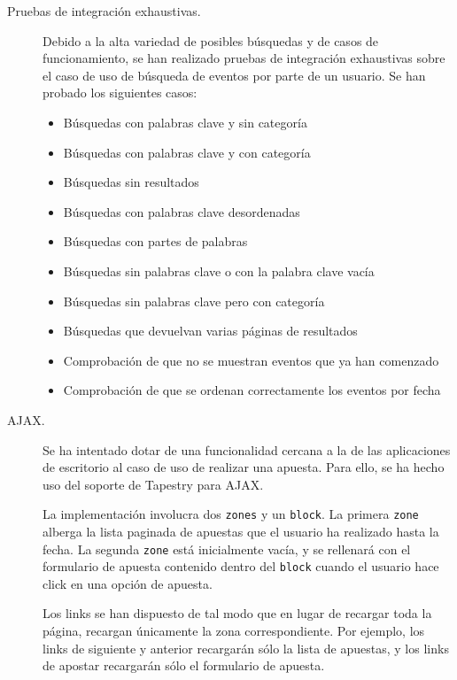 \documentclass[a4paper,twoside]{article}
\begin{document}
\begin{description}
\item[Pruebas de integración exhaustivas.]
  Debido a la alta variedad de posibles búsquedas y de casos de funcionamiento, se han realizado pruebas de integración exhaustivas sobre el caso de uso de búsqueda de eventos por parte de un usuario. Se han probado los siguientes casos:
  \begin{itemize}
  \item Búsquedas con palabras clave y sin categoría
  \item Búsquedas con palabras clave y con categoría
  \item Búsquedas sin resultados
  \item Búsquedas con palabras clave desordenadas
  \item Búsquedas con partes de palabras
  \item Búsquedas sin palabras clave o con la palabra clave vacía
  \item Búsquedas sin palabras clave pero con categoría
  \item Búsquedas que devuelvan varias páginas de resultados
  \item Comprobación de que no se muestran eventos que ya han comenzado
  \item Comprobación de que se ordenan correctamente los eventos por fecha
  \end{itemize}

\item[AJAX.]
  Se ha intentado dotar de una funcionalidad cercana a la de las aplicaciones de escritorio al caso de uso de realizar una apuesta. Para ello, se ha hecho uso del soporte de Tapestry para AJAX.

  La implementación involucra dos {\tt zones} y un {\tt block}. La primera {\tt zone} alberga la lista paginada de apuestas que el usuario ha realizado hasta la fecha. La segunda {\tt zone} está inicialmente vacía, y se rellenará con el formulario de apuesta contenido dentro del {\tt block} cuando el usuario hace click en una opción de apuesta.

  Los links se han dispuesto de tal modo que en lugar de recargar toda la página, recargan únicamente la zona correspondiente. Por ejemplo, los links de siguiente y anterior recargarán sólo la lista de apuestas, y los links de apostar recargarán sólo el formulario de apuesta.

\end{description}
\end{document}
